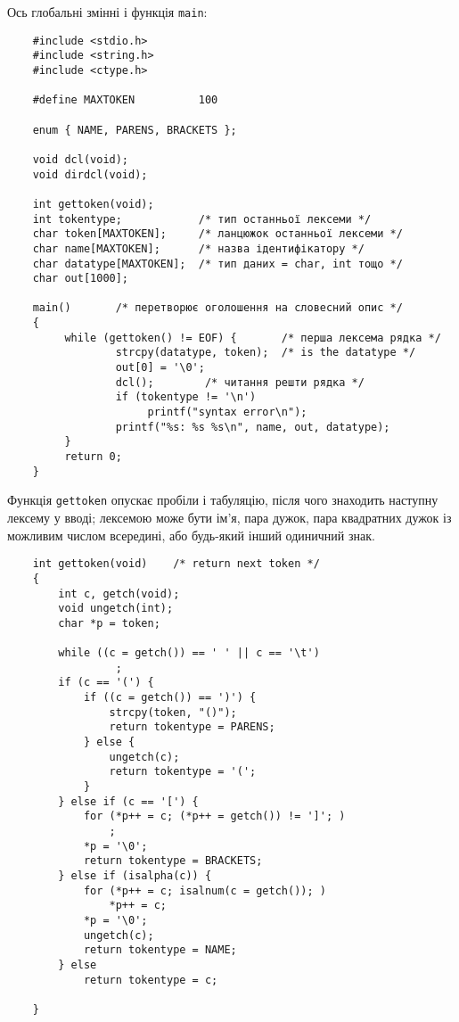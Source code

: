 \documentclass[a4paper,12pt]{book}
\begin{document}
  Ось глобальні змінні і функція \texttt{main}:
  \begin{verbatim}
    #include <stdio.h>
    #include <string.h>
    #include <ctype.h>

    #define MAXTOKEN          100

    enum { NAME, PARENS, BRACKETS };

    void dcl(void);
    void dirdcl(void);

    int gettoken(void);
    int tokentype;            /* тип останньої лексеми */
    char token[MAXTOKEN];     /* ланцюжок останньої лексеми */
    char name[MAXTOKEN];      /* назва ідентифікатору */
    char datatype[MAXTOKEN];  /* тип даних = char, int тощо */
    char out[1000];

    main()       /* перетворює оголошення на словесний опис */
    {
         while (gettoken() != EOF) {       /* перша лексема рядка */
                 strcpy(datatype, token);  /* is the datatype */
                 out[0] = '\0';
                 dcl();        /* читання решти рядка */
                 if (tokentype != '\n')
                      printf("syntax error\n");
                 printf("%s: %s %s\n", name, out, datatype);
         }
         return 0;
    }
  \end{verbatim}

  Функція \texttt{gettoken} опускає пробіли і табуляцію, після чого знаходить наступну
  лексему у вводі; лексемою може бути ім'я, пара дужок, пара квадратних дужок із можливим
  числом всередині, або будь-який інший одиничний знак.
  \begin{verbatim}
    int gettoken(void)    /* return next token */
    {
        int c, getch(void);
        void ungetch(int);
        char *p = token;

        while ((c = getch()) == ' ' || c == '\t')
                 ;
        if (c == '(') {
            if ((c = getch()) == ')') {
                strcpy(token, "()");
                return tokentype = PARENS;
            } else {
                ungetch(c);
                return tokentype = '(';
            }
        } else if (c == '[') {
            for (*p++ = c; (*p++ = getch()) != ']'; )
                ;
            *p = '\0';
            return tokentype = BRACKETS;
        } else if (isalpha(c)) {
            for (*p++ = c; isalnum(c = getch()); )
                *p++ = c;
            *p = '\0';
            ungetch(c);
            return tokentype = NAME;
        } else
            return tokentype = c;

    }
  \end{verbatim}
\end{document}
